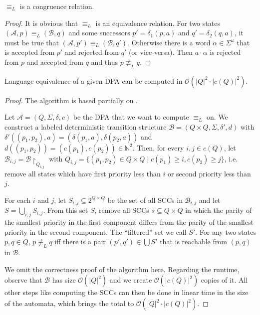 \begin{lem}
	$\equiv_L$ is a congruence relation.
	\label{lem:general:L_congruence}
\end{lem}

\begin{proof}
	It is obvious that $\equiv_L$ is an equivalence relation. For two states $(\mathcal{A}, p) \equiv_L (\mathcal{B}, q)$ and some successors $p' = \delta_1(p, a)$ and $q' = \delta_2(q, a)$, it must be true that $(\mathcal{A}, p') \equiv_L (\mathcal{B}, q')$. Otherwise there is a word $\alpha \in \Sigma^\omega$ that is accepted from $p'$ and rejected from $q'$ (or vice-versa). Then $a \cdot \alpha$ is rejected from $p$ and accepted from $q$ and thus $p \not\equiv_L q$.
\end{proof}

\begin{lem}
	Language equivalence of a given DPA can be computed in $\mathcal{O}(|Q|^2 \cdot |c(Q)|^2)$.
\end{lem}

\begin{proof}
	The algorithm is based partially on \cite{HenzingerTelle1996}.
	
	Let $\mathcal{A} = (Q, \Sigma, \delta, c)$ be the DPA that we want to compute $\equiv_L$ on. We construct a labeled deterministic transition structure $\mathcal{B} = (Q \times Q, \Sigma, \delta', d)$ with $\delta'((p_1, p_2), a) = (\delta(p_1, a), \delta(p_2, a))$ and $d((p_1, p_2)) = (c(p_1), c(p_2)) \in \mathbb{N}^2$. Then, for every $i, j \in c(Q)$, let $\mathcal{B}_{i,j} = \mathcal{B} \upharpoonright_{Q_{i,j}}$ with $Q_{i,j} = \{ (p_1, p_2) \in Q \times Q \mid c(p_1) \geq i, c(p_2) \geq j \}$, i.e. remove all states which have first priority less than $i$ or second priority less than $j$.
	
	For each $i$ and $j$, let $S_{i,j} \subseteq 2^{Q \times Q}$ be the set of all SCCs in $\mathcal{B}_{i,j}$ and let $S = \bigcup_{i,j} S_{i,j}$. From this set $S$, remove all SCCs $s \subseteq Q \times Q$ in which the parity of the smallest priority in the first component differs from the parity of the smallest priority in the second component. The \enquote{filtered} set we call $S'$. For any two states $p, q \in Q$, $p \not\equiv_L q$ iff there is a pair $(p', q') \in \bigcup S'$ that is reachable from $(p, q)$ in $\mathcal{B}$.
	
	We omit the correctness proof of the algorithm here. Regarding the runtime, observe that $\mathcal{B}$ has size $\mathcal{O}(|Q|^2)$ and we create $\mathcal{O}(|c(Q)|^2)$ copies of it. All other steps like computing the SCCs can then be done in linear time in the size of the automata, which brings the total to $\mathcal{O}(|Q|^2 \cdot |c(Q)|^2)$.
\end{proof}

